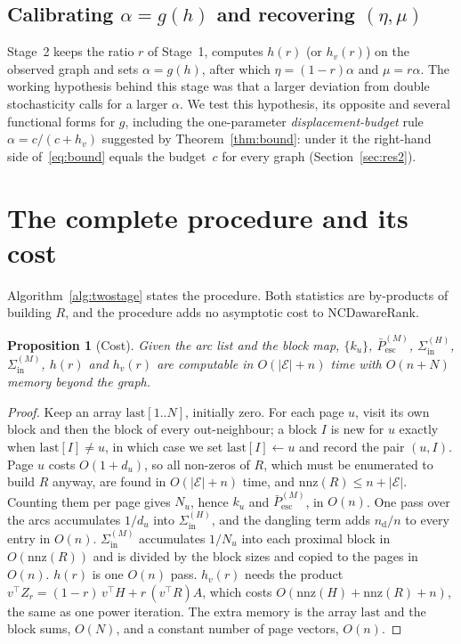 \documentclass[11pt,a4paper]{article}
\newtheorem{proposition}{Proposition}
\theoremstyle{definition}
\theoremstyle{remark}
\newcommand{\Pbar}{\bar P^{(M)}_{\mathrm{esc}}}
\newcommand{\Sin}{\Sigma_{\mathrm{in}}}
\begin{document}
\subsection{Calibrating \texorpdfstring{$\alpha=g(h)$}{α = g(h)} and recovering \texorpdfstring{$(\eta,\mu)$}{(η, μ)}}
Stage~2 keeps the ratio $r$ of Stage~1, computes $h(r)$ (or $h_v(r)$) on the observed graph and sets
$\alpha=g(h)$, after which $\eta=(1-r)\alpha$ and $\mu=r\alpha$. The working hypothesis behind this
stage was that a larger deviation from double stochasticity calls for a larger $\alpha$. We test this
hypothesis, its opposite and several functional forms for $g$, including the one-parameter
\emph{displacement-budget} rule $\alpha=c/(c+h_v)$ suggested by Theorem~\ref{thm:bound}: under it the
right-hand side of~\eqref{eq:bound} equals the budget~$c$ for every graph (Section~\ref{sec:res2}).

\section{The complete procedure and its cost}
\label{sec:proc}

Algorithm~\ref{alg:twostage} states the procedure. Both statistics are by-products of building $R$, and
the procedure adds no asymptotic cost to NCDawareRank.

\begin{proposition}[Cost]\label{prop:cost}
Given the arc list and the block map, $\{k_u\}$, $\Pbar$, $\Sin^{(H)}$, $\Sin^{(M)}$, $h(r)$ and
$h_v(r)$ are computable in $O(|\mathcal E|+n)$ time with $O(n+N)$ memory beyond the graph.
\end{proposition}
\begin{proof}
Keep an array $\mathrm{last}[1..N]$, initially zero. For each page $u$, visit its own block and then the
block of every out-neighbour; a block $I$ is new for $u$ exactly when $\mathrm{last}[I]\ne u$, in which
case we set $\mathrm{last}[I]\gets u$ and record the pair $(u,I)$. Page $u$ costs $O(1+d_u)$, so all
non-zeros of $R$, which must be enumerated to build $R$ anyway, are found in $O(|\mathcal E|+n)$ time,
and $\mathrm{nnz}(R)\le n+|\mathcal E|$. Counting them per page gives $N_u$, hence $k_u$ and $\Pbar$, in
$O(n)$. One pass over the arcs accumulates $1/d_u$ into $\Sin^{(H)}$, and the dangling term adds
$n_{\mathrm d}/n$ to every entry in $O(n)$. $\Sin^{(M)}$ accumulates $1/N_u$ into each proximal block in
$O(\mathrm{nnz}(R))$ and is divided by the block sizes and copied to the pages in $O(n)$. $h(r)$ is one
$O(n)$ pass. $h_v(r)$ needs the product $v^\top Z_r=(1-r)\,v^\top H+r\,(v^\top R)A$, which costs
$O(\mathrm{nnz}(H)+\mathrm{nnz}(R)+n)$, the same as one power iteration. The extra memory is the array
$\mathrm{last}$ and the block sums, $O(N)$, and a constant number of page vectors, $O(n)$.
\end{proof}
\end{document}
